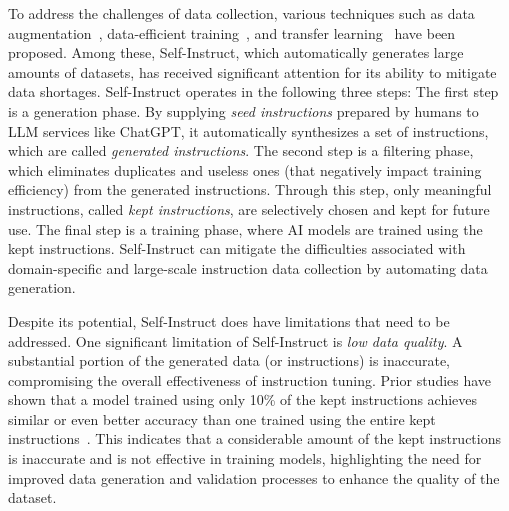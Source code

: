 To address the challenges of data collection, various
techniques such as data augmentation~\cite{backtranslation,eda,self-instruct}, data-efficient
training~\cite{data-efficient}, and transfer learning~\cite{torrey2010transfer} have been proposed.
Among these, Self-Instruct, which automatically generates 
large amounts of datasets, has received significant attention 
for its ability to mitigate data shortages.
Self-Instruct operates in the following three steps:
The first step is a generation phase. 
By supplying \textit{seed instructions} prepared by humans
to LLM services like ChatGPT,
it automatically synthesizes a set of instructions,
which are called \textit{generated instructions}.
The second step is a filtering phase, which
eliminates duplicates and useless ones 
(that negatively impact training efficiency)
from the generated instructions.
Through this step, only meaningful instructions, 
called \textit{kept instructions}, are selectively chosen and 
kept for future use.
The final step is a training phase, where AI models are trained
using the kept instructions. %
Self-Instruct can mitigate the difficulties associated with
domain-specific and large-scale instruction data collection by automating data generation.





Despite its potential, Self-Instruct does have limitations
that need to be addressed.
One significant limitation of Self-Instruct is 
\textit{low data quality}.
A substantial portion of the generated data (or instructions) is inaccurate,
compromising the overall effectiveness of instruction tuning. 
Prior studies have shown that
a model trained using only 10\% of the kept instructions
achieves similar or even better accuracy
than one trained using the entire kept instructions~\cite{alpagasus}.
This indicates that a considerable amount of the kept instructions is 
inaccurate and is not effective in training models,
highlighting the need for improved
data generation and validation processes to enhance the
quality of the dataset.

